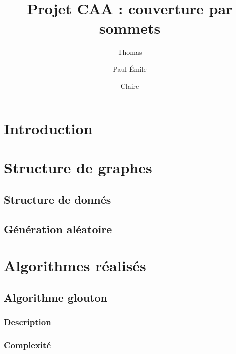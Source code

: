 \documentclass[a4paper,10pt]{article}
\title{Projet CAA : couverture par sommets}
\author{Thomas \bsc{Bellitto}\and Paul-Émile \bsc{Boutoille} \and Claire \bsc{Pennarun}}
\date{}
\begin{document}
\maketitle

\section*{Introduction}


\section{Structure de graphes}

\subsection{Structure de donnés}


\subsection{Génération aléatoire}


\section{Algorithmes réalisés}

\subsection{Algorithme glouton}

 
\subsubsection{Description}


\subsubsection{Complexité}
\end{document}
